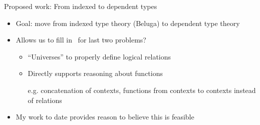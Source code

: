 \documentclass[usenames,dvipsnames]{beamer}
\begin{document}
\begin{frame}{Proposed work: From indexed to dependent types}
\begin{itemize}
\item Goal: move from indexed type theory (Beluga) to dependent type theory
\item Allows us to fill in \good $\,$ for last two problems?
\begin{itemize}
\item ``Universes'' to properly define logical relations
\item Directly supports reasoning about functions

 e.g. concatenation of contexts, functions from contexts to contexts instead of relations
\end{itemize}
\item My work to date provides reason to believe this is feasible

\end{itemize}
\end{frame}

\end{document}
